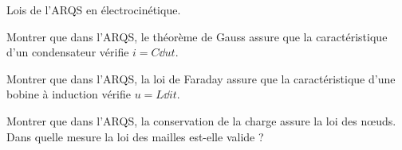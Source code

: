 \documentclass[12pt,fancy]{cours}
\begin{document}
\begin{exemple}{Lois de l’ARQS en électrocinétique.}
  \begin{quest}
    \item	Montrer que dans l’ARQS, le théorème de Gauss assure que la caractéristique d’un condensateur vérifie $i=C\dd{u}{t}$.
    \item Montrer que dans l’ARQS, la loi de Faraday assure que la caractéristique d’une bobine à induction vérifie $u=L\dd{i}{t}$.
    \item Montrer que dans l’ARQS, la conservation de la charge assure la loi des nœuds. Dans quelle mesure la loi des mailles est-elle valide ?
  \end{quest}
\end{exemple}
\end{document}
